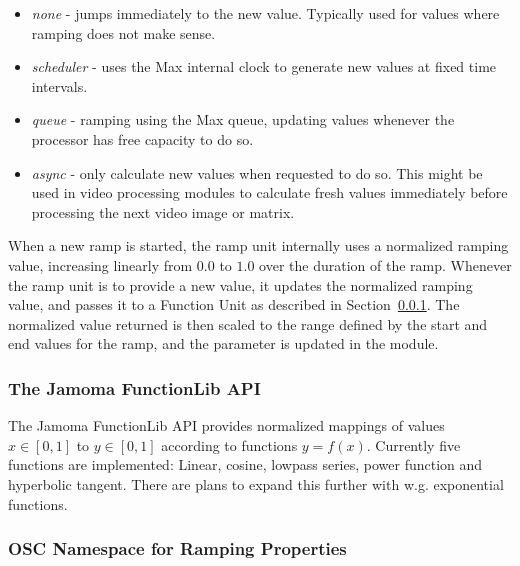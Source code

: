 \documentclass{NIME-alternate}
\begin{document}
\begin{Abstract}
\begin{itemize}

	\item \emph{none} - jumps immediately to the new value. Typically used for values where ramping does not make sense.

	\item \emph{scheduler} - uses the Max internal clock to generate new values at fixed time intervals.

	\item \emph{queue} - ramping using the Max queue, updating values whenever the processor has free capacity to do so.

	\item \emph{async} - only calculate new values when requested to do so. This might be used in video processing modules to calculate fresh values immediately before processing the next video image or matrix.
	
\end{itemize}

When a new ramp is started, the ramp unit internally uses a normalized ramping value, increasing linearly from $0.0$ to $1.0$ over the duration of the ramp. Whenever the ramp unit is to provide a new value, it updates the normalized ramping value, and passes it to a Function Unit as described in Section~\ref{ssub:the_function_lib}. The normalized value returned is then scaled to the range defined by the start and end values for the ramp, and the parameter is updated in the module.



\subsubsection{The Jamoma FunctionLib API} %
\label{ssub:the_function_lib}

The Jamoma FunctionLib API provides normalized mappings of values $x \in [0,1]$ to $y \in [0,1]$ according to functions $y = f(x)$. Currently five functions are implemented: Linear, cosine, lowpass series, power function and hyperbolic tangent. There are plans to expand this further with w.g. exponential functions.




\subsubsection{OSC Namespace for Ramping Properties} %
\label{ssub:osc_namespace_for_ramping_properties}


\end{Abstract}
\end{document}
